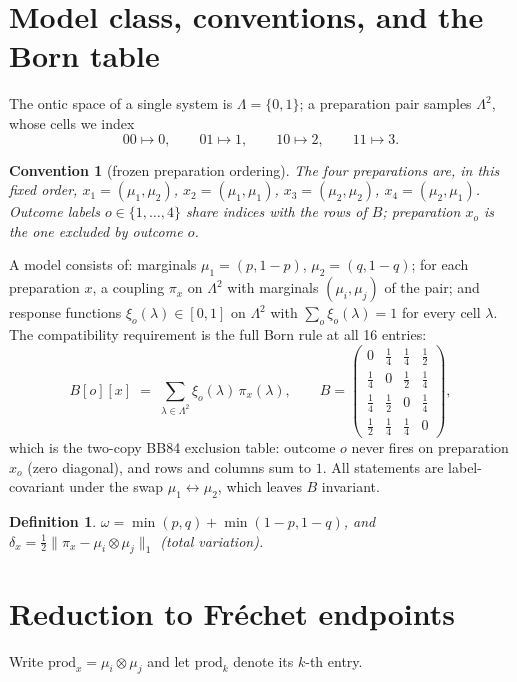 \documentclass[11pt,a4paper]{article}
\newtheorem{definition}{Definition}
\newtheorem{convention}{Convention}
\newcommand{\dd}{\delta}
\begin{document}
\section{Model class, conventions, and the Born table}
\label{sec:setup}
The ontic space of a single system is $\Lambda=\{0,1\}$; a preparation pair samples $\Lambda^2$, whose cells we index
\[
00\mapsto 0,\qquad 01\mapsto 1,\qquad 10\mapsto 2,\qquad 11\mapsto 3 .
\]
\begin{convention}[frozen preparation ordering]
\label{conv}
The four preparations are, in this fixed order,
$x_1=(\mu_1,\mu_2)$, $x_2=(\mu_1,\mu_1)$, $x_3=(\mu_2,\mu_2)$, $x_4=(\mu_2,\mu_1)$.
Outcome labels $o\in\{1,\dots,4\}$ share indices with the rows of $B$; preparation $x_o$ is the one excluded by outcome $o$.
\end{convention}
A model consists of: marginals $\mu_1=(p,1-p)$, $\mu_2=(q,1-q)$; for each preparation $x$, a coupling $\pi_x$ on $\Lambda^2$ with marginals $(\mu_i,\mu_j)$ of the pair; and response functions $\xi_o(\lambda)\in[0,1]$ on $\Lambda^2$ with $\sum_o \xi_o(\lambda)=1$ for every cell $\lambda$. The compatibility requirement is the full Born rule at all 16 entries:
\begin{equation}
\label{eq:B}
B[o][x]\;=\;\sum_{\lambda\in\Lambda^2}\xi_o(\lambda)\,\pi_x(\lambda),
\qquad
B=\begin{pmatrix}
0&\tfrac14&\tfrac14&\tfrac12\\
\tfrac14&0&\tfrac12&\tfrac14\\
\tfrac14&\tfrac12&0&\tfrac14\\
\tfrac12&\tfrac14&\tfrac14&0
\end{pmatrix},
\end{equation}
which is the two-copy BB84 exclusion table: outcome $o$ never fires on preparation $x_o$ (zero diagonal), and rows and columns sum to $1$. All statements are label-covariant under the swap $\mu_1\leftrightarrow\mu_2$, which leaves $B$ invariant.

\begin{definition}
$\omega=\min(p,q)+\min(1-p,1-q)$, and $\dd_x=\tfrac12\|\pi_x-\mu_i\otimes\mu_j\|_1$ (total variation).
\end{definition}

\section{Reduction to Fr\'echet endpoints}
Write $\mathrm{prod}_x=\mu_i\otimes\mu_j$ and let $\mathrm{prod}_k$ denote its $k$-th entry.
\end{document}

